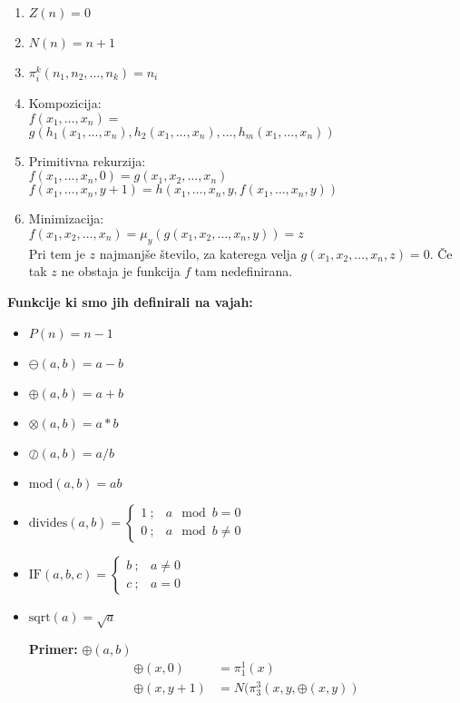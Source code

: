 \documentclass[a4paper]{article}
\begin{document}
\begin{multicols}{2}
\begin{enumerate}
\item $Z(n)=0$
\item $N(n)=n+1$
\item $\pi^k_i (n_1, n_2, \dots, n_k)=n_i$
\item Kompozicija: \\
	$ f(x_1, \dots, x_n) = $ \\ $ g(h_1(x_1, \dots, x_n), h_2(x_1,\dots, x_n), \dots, h_m(x_1, \dots, x_n)) $ 
\item Primitivna rekurzija: \\
	$ f(x_1, \dots, x_n, 0) = g(x_1, x_2, \dots, x_n) $ \\
	$ f(x_1, \dots, x_n, y+1) = h(x_1, \dots, x_n, y, f(x_1, \dots, x_n, y)) $
\item Minimizacija: \\
	$ f(x_1, x_2, \dots, x_n) = \mu_y (g(x_1, x_2, \dots, x_n, y)) = z $ \\
	Pri tem je $z$ najmanjše število, za katerega velja $g(x_1, x_2, \dots, x_n, z) = 0$. Če tak $z$ ne obstaja je funkcija $f$ tam nedefinirana.
\end{enumerate}
\textbf{Funkcije ki smo jih definirali na vajah:}
\begin{itemize}
\item $P(n) = n-1$
\item $\ominus(a,b) = a-b$
\item $\oplus(a,b) = a+b$
\item $\otimes(a,b) = a*b$
\item $\oslash(a,b) = a/b$
\item $\text{mod}(a,b) = ab$
\item $\text{divides}(a,b) = \begin{cases} 1 \ ; & a \mod b = 0 \\ 0 \ ; & a \mod b \neq 0 \end{cases}$
\item $\text{IF}(a,b,c) = \begin{cases} b \ ; & a \neq 0 \\ c\ ; & a = 0 \end{cases}$
\item $\text{sqrt}(a) = \sqrt{a} $

\textbf{Primer:} $ \oplus (a,b) $
\begin{align*}
 \oplus(x,0) &= \pi^1_1(x)\\
\oplus(x,y+1) &= N(\pi^3_3(x,y,\oplus(x,y))
\end{align*}

\end{itemize}

\end{multicols}
\end{document}
